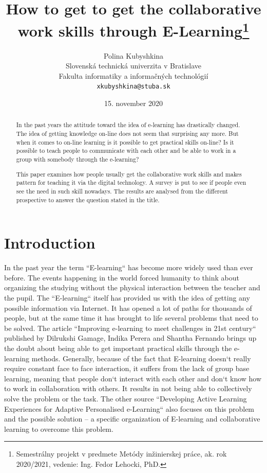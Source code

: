 \documentclass[10pt,oneside,english,a4paper]{article}
\title{How to get  to get the collaborative work skills through E-Learning\thanks{Semestrálny projekt v predmete Metódy inžinierskej práce, ak. rok 2020/2021, vedenie: Ing. Fedor Lehocki, PhD.}}
\author{Polina Kubyshkina\\[2pt]
	{\small Slovenská technická univerzita v Bratislave}\\
	{\small Fakulta informatiky a informačných technológií}\\
	{\small \texttt{xkubyshkina@stuba.sk}}
	}
\date{\small  15. november 2020}
\begin{document}
\maketitle
\begin{abstract}
In the past years the attitude toward the idea of e-learning has drastically changed. The idea of getting knowledge on-line does not seem that surprising any more. But when it comes to on-line learning is it possible to get practical skills on-line? Is it possible to teach people to communicate with each other and be able to work in a group with somebody through the e-learning?\par
This paper examines how people usually get the collaborative work skills and makes pattern for teaching it via the digital technology. A survey is put to see if people even see the need in such skill nowadays. The results are analysed from the different prospective to answer the question stated in the title.
\end{abstract}

\section{Introduction}

In the past year the term ``E-learning`` has become more widely used than ever before. The events happening in the world forced humanity to think about organizing the studying without the physical interaction between the teacher and the pupil. The ``E-learning`` itself has provided us with the idea of getting any possible information via Internet. It has opened a lot of paths for thousands of people, but at the same time it has brought to life several problems that need to be solved. The article ``Improving e-learning to meet challenges in 21st century`` published by Dilrukshi Gamage, Indika Perera and Shantha Fernando brings up the doubt about being able to get important practical skills through the e-learning methods.\cite{collab2} Generally, because of the fact that E-learning doesn`t really require constant face to face interaction, it suffers from the lack of group base learning, meaning that people don`t interact with each other and don`t know how to work in collaboration with others. It results in not being able to collectively solve the problem or the task. The other source ``Developing Active Learning Experiences for Adaptive Personalised e-Learning`` also focuses on this problem and the possible solution – a specific organization of E-learning and collaborative learning to overcome this problem.\cite{collab1}
\end{document}
